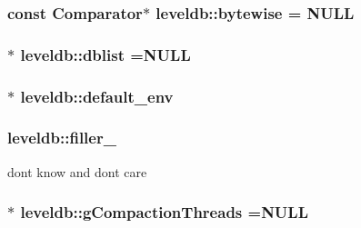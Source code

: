 \subsubsection[{bytewise}]{\setlength{\rightskip}{0pt plus 5cm}const {\bf Comparator}$\ast$ leveldb\+::bytewise = N\+U\+L\+L\hspace{0.3cm}{\ttfamily [static]}}\label{namespaceleveldb_abacb49d42ee3c64ccbc0ce22391816d4}
\hypertarget{namespaceleveldb_a104dd68e027e61627f258f17081d6f38}{}
\subsubsection[{dblist}]{$\ast$ leveldb\+::dblist =N\+U\+L\+L\hspace{0.3cm}{\ttfamily [static]}}\label{namespaceleveldb_a104dd68e027e61627f258f17081d6f38}
\hypertarget{namespaceleveldb_a9ade93809ff59d5e6da0adc55c326a84}{}
\subsubsection[{default\+\_\+env}]{$\ast$ leveldb\+::default\+\_\+env\hspace{0.3cm}{\ttfamily [static]}}\label{namespaceleveldb_a9ade93809ff59d5e6da0adc55c326a84}
\hypertarget{namespaceleveldb_a3521934daf5e6b167206c789df9a1a18}{}
\subsubsection[{filler\+\_\+}]{ leveldb\+::filler\+\_\+}\label{namespaceleveldb_a3521934daf5e6b167206c789df9a1a18}


don\textquotesingle{}t know and don\textquotesingle{}t care 

\hypertarget{namespaceleveldb_ae13159afb5d5c5b0554477e51cf992fd}{}
\subsubsection[{g\+Compaction\+Threads}]{ $\ast$ leveldb\+::g\+Compaction\+Threads =N\+U\+L\+L}\label{namespaceleveldb_ae13159afb5d5c5b0554477e51cf992fd}
\hypertarget{namespaceleveldb_a399bfb270c13d13ad936e382957db021}{}
